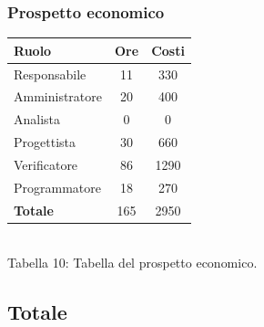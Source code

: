 \subsubsection{Prospetto economico}
\begin{center}
\begin{tabular}{| l | c | c |}
\hline
Ruolo & Ore & Costi \\
\hline
Responsabile & 11 & 330 \\
Amministratore & 20 & 400 \\
Analista & 0 & 0\\
Progettista & 30 & 660 \\
Verificatore & 86 & 1290 \\
Programmatore & 18 & 270 \\
\hline
\textbf{Totale} & 165 & 2950 \\
\hline
\end{tabular}
\\
Tabella 10: Tabella del prospetto economico.
\end{center}
\subsection{Totale}

